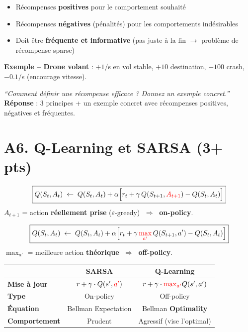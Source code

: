 \documentclass[11pt,a4paper]{article}
\begin{document}
\begin{formbox}
\begin{itemize}[nosep]
\item Récompenses \textbf{positives} pour le comportement souhaité
\item Récompenses \textbf{négatives} (pénalités) pour les comportements indésirables
\item Doit être \textbf{fréquente et informative} (pas juste à la fin $\to$ problème de récompense sparse)
\end{itemize}
\textbf{Exemple -- Drone volant} : $+1$/s en vol stable, $+10$ destination, $-100$ crash, $-0.1$/s (encourage vitesse).
\end{formbox}

\begin{exambox}
\textit{``Comment définir une récompense efficace ? Donnez un exemple concret.''}\\[4pt]
\textbf{Réponse} : 3 principes + un exemple concret avec récompenses positives, négatives et fréquentes.
\end{exambox}

\section{A6. Q-Learning et SARSA (3+ pts)}

\begin{formbox}
$$\boxed{Q(S_t, A_t) \;\leftarrow\; Q(S_t, A_t) + \alpha \Big[r_t + \gamma \, Q(S_{t+1}, \textcolor{red}{A_{t+1}}) - Q(S_t, A_t)\Big]}$$
$A_{t+1}$ = action \textbf{réellement prise} ($\varepsilon$-greedy) $\;\Rightarrow\;$ \textbf{on-policy}.
\end{formbox}

\begin{formbox}
$$\boxed{Q(S_t, A_t) \;\leftarrow\; Q(S_t, A_t) + \alpha \Big[r_t + \gamma \, \textcolor{red}{\max_{a'}} \, Q(S_{t+1}, a') - Q(S_t, A_t)\Big]}$$
$\max_{a'}$ = meilleure action \textbf{théorique} $\;\Rightarrow\;$ \textbf{off-policy}.
\end{formbox}

\begin{center}
\renewcommand{\arraystretch}{1.3}
\begin{tabular}{@{}l c c@{}}
\toprule
& \textbf{SARSA} & \textbf{Q-Learning} \\
\midrule
\textbf{Mise à jour} & $r + \gamma \cdot Q(s', \textcolor{red}{a'})$ & $r + \gamma \cdot \textcolor{red}{\max_{a'}} Q(s', a')$ \\
\textbf{Type} & On-policy & Off-policy \\
\textbf{Équation} & Bellman Expectation & Bellman \textbf{Optimality} \\
\textbf{Comportement} & Prudent & Agressif (vise l'optimal) \\
\bottomrule
\end{tabular}
\end{center}
\end{document}
